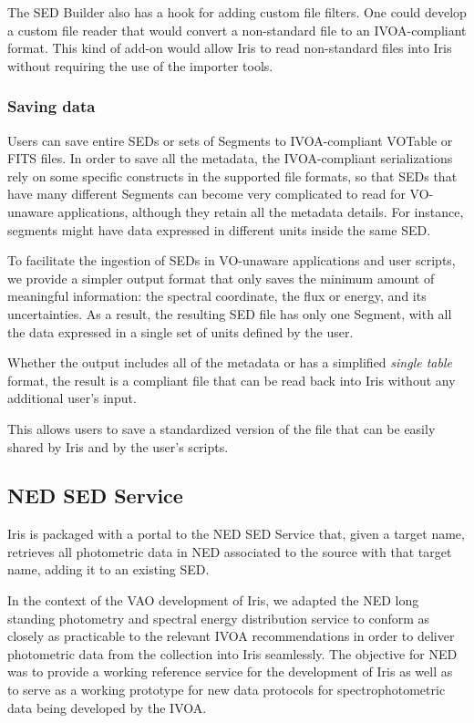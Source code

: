 \documentclass[preprint,authoryear,5p]{elsarticle}
\begin{document}
The SED Builder also has a hook for adding custom file filters. One could develop
a custom file reader that would convert a non-standard file to an IVOA-compliant
format. This kind of add-on would allow Iris to read non-standard
files into Iris without requiring the use of the importer tools.

\subsubsection{Saving data} Users can save entire SEDs or sets of Segments to
IVOA-compliant VOTable or FITS files. In order to save all the metadata, the
IVOA-compliant serializations rely on some specific constructs in the supported
file formats, so that SEDs that have many different Segments can become very
complicated to read for VO-unaware applications, although they retain all the
metadata details. For instance, segments might have data expressed in different
units inside the same SED.

To facilitate the ingestion of SEDs in VO-unaware applications and user scripts,
we provide a simpler output format that only saves the minimum amount of
meaningful information: the spectral coordinate, the flux or energy, and its
uncertainties. As a result, the resulting SED file has only
one Segment, with all the data expressed in a single set of units defined by the user.

Whether the output includes all of the metadata or has a simplified \emph{single
table} format, the result is a compliant file that can be read back into Iris
without any additional user's input.

This allows users to save a standardized version of the file that can be easily
shared by Iris and by the user's scripts.

\subsection{NED SED Service} \label{subsec:ned}

Iris is packaged with a portal to the NED SED
Service that, given a target name,
retrieves all photometric data in NED associated to the source with that target
name, adding it to an existing SED.

In the context of the VAO development of Iris, we adapted the NED long standing photometry and spectral energy
distribution service to conform as closely as practicable to the relevant
IVOA recommendations in order to deliver photometric data from the
collection into Iris seamlessly. The objective for NED was to provide a working reference
service for the development of Iris as well as to serve as a working prototype
for new data protocols for spectrophotometric data being developed by the IVOA.
\end{document}
